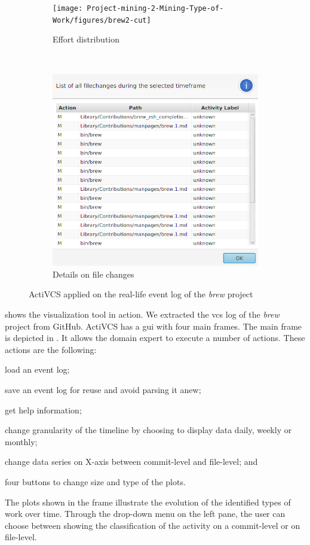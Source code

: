 \begin{figure}[]
\begin{subfigure}[b]{0.7\textwidth}
    \centering
    \texttt{[image: Project-mining-2-Mining-Type-of-Work/figures/brew2-cut]}
    \caption{Effort distribution}
    \label{fig:brew2}
\end{subfigure}~
\begin{subfigure}[b]{0.3\textwidth}
    \centering
    \includegraphics[width=\textwidth]{Project-mining-2-Mining-Type-of-Work/figures/brew1-cut}
    \caption{Details on file changes}
    \label{fig:brew1}
\end{subfigure}

\caption{ActiVCS applied on the real-life event log of the \textsl{brew} project}
\label{fig:activcs-screenshots}
\end{figure}

 shows the visualization tool in action. We extracted the \gls{vcs} log of the \textsl{brew} project from GitHub. ActiVCS has a \gls{gui} with four main frames. The main frame is depicted in . It allows the domain expert to execute a number of actions. These actions are the following: \begin{inparaenum}[\itshape i)] 
\item load an event log; 
\item save an event log for reuse and avoid parsing it anew;
\item get help information;
\item change granularity of the timeline by choosing to display data daily, weekly or monthly; 
\item change data series on X-axis between commit-level and file-level; and
\item four buttons to change size and type of the plots.
\end{inparaenum}
The plots shown in the frame illustrate the evolution of the identified types of work over time. Through the drop-down menu on the left pane, the user can choose between showing the classification of the activity on a commit-level or on file-level.  

